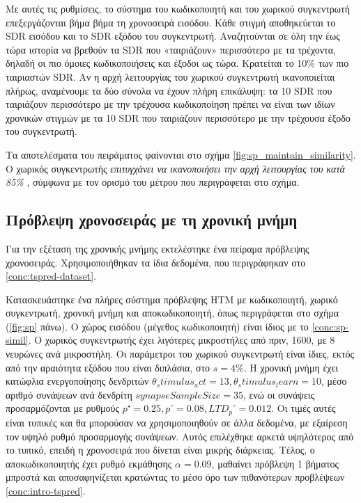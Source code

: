 	Με αυτές τις ρυθμίσεις, το σύστημα του κωδικοποιητή και του χωρικού συγκεντρωτή επεξεργάζονται βήμα βήμα τη χρονοσειρά εισόδου.
	Κάθε στιγμή αποθηκεύεται το SDR εισόδου και το SDR εξόδου του συγκεντρωτή.
	Αναζητούνται σε όλη την έως τώρα ιστορία να βρεθούν τα SDR που «ταιριάζουν» περισσότερο με τα τρέχοντα,
	δηλαδή οι πιο όμοιες κωδικοποιήσεις και έξοδοι ως τώρα.
	Κρατείται το 10\% των πιο ταιριαστών SDR.
	Αν η αρχή λειτουργίας του χωρικού συγκεντρωτή ικανοποιείται πλήρως,
	αναμένουμε τα δύο σύνολα να έχουν πλήρη επικάλυψη:
	τα 10 SDR που ταιριάζουν περισσότερο με την τρέχουσα κωδικοποίηση πρέπει να είναι των ιδίων χρονικών στιγμών
	με τα 10 SDR που ταιριάζουν περισσότερο με την τρέχουσα έξοδο του συγκεντρωτή.

	Τα αποτελέσματα του πειράματος φαίνονται στο σχήμα \ref{fig:sp_maintain_similarity}.
	Ο χωρικός συγκεντρωτής \textit{επιτυγχάνει να ικανοποιήσει την αρχή λειτουργίας του κατά 85\% },
	σύμφωνα με τον ορισμό του μέτρου που περιγράφεται στο σχήμα.

\subsection{Πρόβλεψη χρονοσειράς με τη χρονική μνήμη} \label{conc:tm-pred}

	Για την εξέταση της χρονικής μνήμης εκτελέστηκε ένα πείραμα πρόβλεψης χρονοσειράς.
	Χρησιμοποιήθηκαν τα ίδια δεδομένα, που περιγράφηκαν στο \ref{conc:tspred-dataset}.

	Κατασκευάστηκε ένα πλήρες σύστημα πρόβλεψης HTM με κωδικοποιητή, χωρικό συγκεντρωτή, χρονική μνήμη και αποκωδικοποιητή,
	όπως περιγράφεται στο σχήμα (\ref{fig:sp} πάνω).
	Ο χώρος εισόδου (μέγεθος κωδικοποιητή) είναι ίδιος με το \ref{conc:sp-simil}.
	Ο χωρικός συγκεντρωτής έχει λιγότερες μικροστήλες από πριν, 1600, με 8 νευρώνες ανά μικροστήλη.
	Οι παράμετροι του χωρικού συγκεντρωτή είναι ίδιες, εκτός από την αραιότητα εξόδου που είναι διπλάσια, στο $s=4\%$.
	Η χρονική μνήμη έχει κατώφλια ενεργοποίησης δενδριτών $\mathit{θ_stimulus_act}=13, \mathit{θ_stimulus_learn}=10$,
	μέσο αριθμό συνάψεων ανά δενδρίτη $\mathit{synapseSampleSize}=35$,
	ενώ οι συνάψεις προσαρμόζονται με ρυθμούς $p⁺=0.25,p⁻=0.08,\mathit{LTD_p⁻}= 0.012$.
	Οι τιμές αυτές είναι τυπικές και θα μπορούσαν να χρησιμοποιηθούν σε άλλα δεδομένα, με εξαίρεση τον υψηλό ρυθμό προσαρμογής συνάψεων.
	Αυτός επιλέχθηκε αρκετά υψηλότερος από το τυπικό, επειδή η χρονοσειρά που δίνεται είναι μικρής διάρκειας.
	Τέλος, ο αποκωδικοποιητής έχει ρυθμό εκμάθησης $α=0.09$, μαθαίνει πρόβλεψη 1 βήματος μπροστά
	και αποσαφηνίζεται κρατώντας το μέσο όρο των πιθανότερων προβλέψεων \ref{conc:intro-tspred}.

